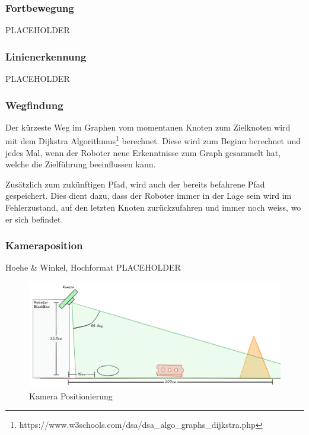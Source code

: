 \subsubsection{Fortbewegung}

PLACEHOLDER

\subsubsection{Linienerkennung}

PLACEHOLDER

\subsubsection{Wegfindung}

Der kürzeste Weg im Graphen vom momentanen Knoten zum Zielknoten wird mit dem Dijkstra Algorithmus\footnote{https://www.w3schools.com/dsa/dsa\_algo\_graphs\_dijkstra.php} berechnet. Diese wird zum Beginn berechnet und jedes Mal, wenn der Roboter neue Erkenntnisse zum Graph gesammelt hat, welche die Zielführung beeinflussen kann.

Zusätzlich zum zukünftigen Pfad, wird auch der bereits befahrene Pfad gespeichert. Dies dient dazu, dass der Roboter immer in der Lage sein wird im Fehlerzustand, auf den letzten Knoten zurückzufahren und immer noch weiss, wo er sich befindet.

\subsubsection{Kameraposition}

Hoehe \& Winkel, Hochformat PLACEHOLDER

\begin{figure}[H]
    \centering
    \includegraphics[width=1\linewidth]{assets//informatik-prototyp//camera/camera_position.png}
    \caption{Kamera Positionierung}
    \label{fig:camera-position-concept}
\end{figure}

